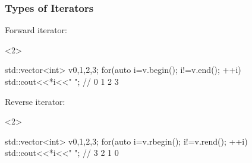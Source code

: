 \documentclass[aspectratio=43]{beamer}
\begin{document}
\begin{frame}[fragile]\frametitle{Types of Iterators}
  \begin{center}
    Forward iterator:\\
    \begin{onlyenv}<2>
    \begin{Cpplisting}{}
std::vector<int> v{0,1,2,3};
for(auto i=v.begin(); i!=v.end(); ++i)
  std::cout<<*i<<" "; // 0 1 2 3
  \end{Cpplisting}
\end{onlyenv}
    Reverse iterator:\\
    \begin{onlyenv}<2>
    \begin{Cpplisting}{}
std::vector<int> v{0,1,2,3};
for(auto i=v.rbegin(); i!=v.rend(); ++i)
  std::cout<<*i<<" "; // 3 2 1 0
  \end{Cpplisting}
\end{onlyenv}
  \end{center}
\end{frame}
\end{document}
